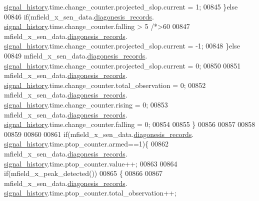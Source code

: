 \begin{DoxyCode}
{      \hyperlink{a00019_ab7038f4de1f77b52a7f89e9f77c0b846}{signal\_history}.time.change\_counter.projected\_slop.current = 1;
00845              \}\textcolor{keywordflow}{else}
00846              \textcolor{keywordflow}{if}(mfield\_x\_sen\_data.\hyperlink{a00025_a2bd79ce84bbd6b7f50d38954f7ae475e}{diagonesis\_records}.
      \hyperlink{a00019_ab7038f4de1f77b52a7f89e9f77c0b846}{signal\_history}.time.change\_counter.falling > 5 \textcolor{comment}{/*>60%
00847               mfield\_x\_sen\_data.\hyperlink{a00025_a2bd79ce84bbd6b7f50d38954f7ae475e}{diagonesis\_records}.
      \hyperlink{a00019_ab7038f4de1f77b52a7f89e9f77c0b846}{signal\_history}.time.change\_counter.projected\_slop.current = -1;
00848              \}\textcolor{keywordflow}{else}
00849               mfield\_x\_sen\_data.\hyperlink{a00025_a2bd79ce84bbd6b7f50d38954f7ae475e}{diagonesis\_records}.
      \hyperlink{a00019_ab7038f4de1f77b52a7f89e9f77c0b846}{signal\_history}.time.change\_counter.projected\_slop.current = 0;
00850 
00851                  mfield\_x\_sen\_data.\hyperlink{a00025_a2bd79ce84bbd6b7f50d38954f7ae475e}{diagonesis\_records}.
      \hyperlink{a00019_ab7038f4de1f77b52a7f89e9f77c0b846}{signal\_history}.time.change\_counter.total\_observation = 0;
00852                  mfield\_x\_sen\_data.\hyperlink{a00025_a2bd79ce84bbd6b7f50d38954f7ae475e}{diagonesis\_records}.
      \hyperlink{a00019_ab7038f4de1f77b52a7f89e9f77c0b846}{signal\_history}.time.change\_counter.rising            = 0;
00853                  mfield\_x\_sen\_data.\hyperlink{a00025_a2bd79ce84bbd6b7f50d38954f7ae475e}{diagonesis\_records}.
      \hyperlink{a00019_ab7038f4de1f77b52a7f89e9f77c0b846}{signal\_history}.time.change\_counter.falling           = 0;
00854 
00855            \}
00856 
00857 
00858 
00859 
00860 
00861           \textcolor{keywordflow}{if}(mfield\_x\_sen\_data.\hyperlink{a00025_a2bd79ce84bbd6b7f50d38954f7ae475e}{diagonesis\_records}.
      \hyperlink{a00019_ab7038f4de1f77b52a7f89e9f77c0b846}{signal\_history}.time.ptop\_counter.armed==1)\{
00862                mfield\_x\_sen\_data.\hyperlink{a00025_a2bd79ce84bbd6b7f50d38954f7ae475e}{diagonesis\_records}.
      \hyperlink{a00019_ab7038f4de1f77b52a7f89e9f77c0b846}{signal\_history}.time.ptop\_counter.value++;
00863 
00864                \textcolor{keywordflow}{if}(mfield\_x\_peak\_detected())
00865                 \{
00866 
00867                    mfield\_x\_sen\_data.\hyperlink{a00025_a2bd79ce84bbd6b7f50d38954f7ae475e}{diagonesis\_records}.
      \hyperlink{a00019_ab7038f4de1f77b52a7f89e9f77c0b846}{signal\_history}.time.ptop\_counter.total\_observation++;
}}
\end{DoxyCode}
